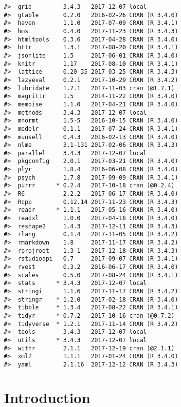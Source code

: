 \documentclass[]{book}
\theoremstyle{definition}
\theoremstyle{definition}
\theoremstyle{definition}
\theoremstyle{remark}
\begin{document}
\begin{verbatim}
#>  grid         3.4.3   2017-12-07 local         
#>  gtable       0.2.0   2016-02-26 CRAN (R 3.4.0)
#>  haven        1.1.0   2017-07-09 CRAN (R 3.4.1)
#>  hms          0.4.0   2017-11-23 CRAN (R 3.4.3)
#>  htmltools    0.3.6   2017-04-28 CRAN (R 3.4.0)
#>  httr         1.3.1   2017-08-20 CRAN (R 3.4.1)
#>  jsonlite     1.5     2017-06-01 CRAN (R 3.4.0)
#>  knitr        1.17    2017-08-10 CRAN (R 3.4.1)
#>  lattice      0.20-35 2017-03-25 CRAN (R 3.4.3)
#>  lazyeval     0.2.1   2017-10-29 CRAN (R 3.4.2)
#>  lubridate    1.7.1   2017-11-03 cran (@1.7.1) 
#>  magrittr     1.5     2014-11-22 CRAN (R 3.4.0)
#>  memoise      1.1.0   2017-04-21 CRAN (R 3.4.0)
#>  methods      3.4.3   2017-12-07 local         
#>  mnormt       1.5-5   2016-10-15 CRAN (R 3.4.0)
#>  modelr       0.1.1   2017-07-24 CRAN (R 3.4.1)
#>  munsell      0.4.3   2016-02-13 CRAN (R 3.4.0)
#>  nlme         3.1-131 2017-02-06 CRAN (R 3.4.3)
#>  parallel     3.4.3   2017-12-07 local         
#>  pkgconfig    2.0.1   2017-03-21 CRAN (R 3.4.0)
#>  plyr         1.8.4   2016-06-08 CRAN (R 3.4.0)
#>  psych        1.7.8   2017-09-09 CRAN (R 3.4.1)
#>  purrr      * 0.2.4   2017-10-18 cran (@0.2.4) 
#>  R6           2.2.2   2017-06-17 CRAN (R 3.4.0)
#>  Rcpp         0.12.14 2017-11-23 CRAN (R 3.4.3)
#>  readr      * 1.1.1   2017-05-16 CRAN (R 3.4.0)
#>  readxl       1.0.0   2017-04-18 CRAN (R 3.4.0)
#>  reshape2     1.4.3   2017-12-11 CRAN (R 3.4.3)
#>  rlang        0.1.4   2017-11-05 CRAN (R 3.4.2)
#>  rmarkdown    1.8     2017-11-17 CRAN (R 3.4.2)
#>  rprojroot    1.3-1   2017-12-18 CRAN (R 3.4.3)
#>  rstudioapi   0.7     2017-09-07 CRAN (R 3.4.1)
#>  rvest        0.3.2   2016-06-17 CRAN (R 3.4.0)
#>  scales       0.5.0   2017-08-24 CRAN (R 3.4.1)
#>  stats      * 3.4.3   2017-12-07 local         
#>  stringi      1.1.6   2017-11-17 CRAN (R 3.4.2)
#>  stringr    * 1.2.0   2017-02-18 CRAN (R 3.4.0)
#>  tibble     * 1.3.4   2017-08-22 CRAN (R 3.4.1)
#>  tidyr      * 0.7.2   2017-10-16 cran (@0.7.2) 
#>  tidyverse  * 1.2.1   2017-11-14 CRAN (R 3.4.2)
#>  tools        3.4.3   2017-12-07 local         
#>  utils      * 3.4.3   2017-12-07 local         
#>  withr        2.1.1   2017-12-19 cran (@2.1.1) 
#>  xml2         1.1.1   2017-01-24 CRAN (R 3.4.0)
#>  yaml         2.1.16  2017-12-12 CRAN (R 3.4.3)
\end{verbatim}

\hypertarget{introduction}{%
\chapter{Introduction}\label{introduction}}
\end{document}
